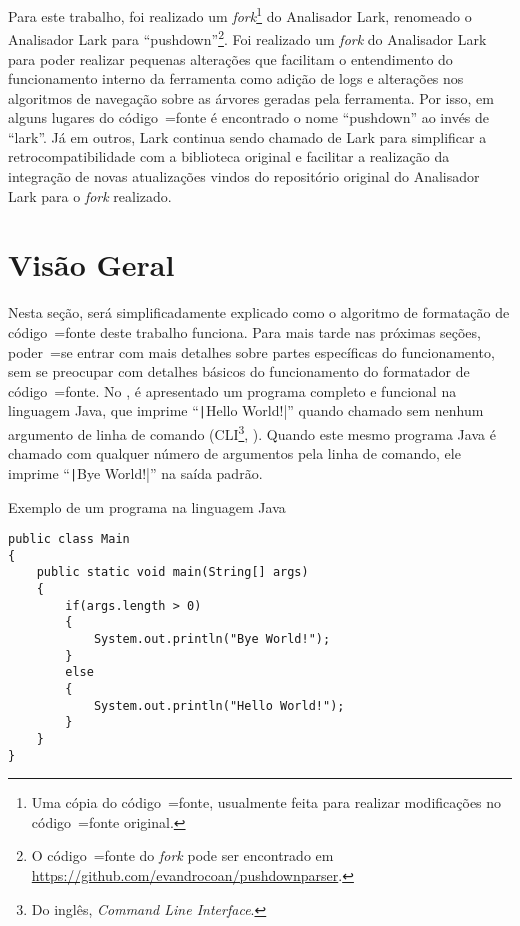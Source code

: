Para este trabalho,
foi realizado um \textit{fork}\footnote{
Uma cópia do código~=fonte,
usualmente feita para realizar modificações no código~=fonte original.
}
\cite{overviewOfGitHubForks,mayTheForkBeWithYou,collaborationAmongGitHubUsers} do Analisador Lark,
renomeado o Analisador Lark \cite{larkContextualLexer} para ``pushdown''\footnote{%
O código~=fonte do \textit{fork} pode ser encontrado em \url{https://github.com/evandrocoan/pushdownparser}.
}.
Foi realizado um \textit{fork} do Analisador Lark para poder realizar pequenas alterações que facilitam o entendimento do funcionamento interno da ferramenta como adição de logs e
alterações nos algoritmos de navegação sobre as árvores geradas pela ferramenta.
Por isso,
em alguns lugares do código~=fonte é encontrado o nome ``pushdown'' ao invés de ``lark''.
Já em outros,
Lark continua sendo chamado de Lark para simplificar a retrocompatibilidade com a biblioteca original e
facilitar a realização da integração de novas atualizações vindos do repositório original do Analisador Lark para o \textit{fork} realizado.


\section{Visão Geral}
\label{section:softwareImplementationVisaoGeral}

Nesta seção,
será simplificadamente explicado como o algoritmo de formatação de código~=fonte deste trabalho funciona.
Para mais tarde nas próximas seções,
poder~=se entrar com mais detalhes sobre partes específicas do funcionamento,
sem se preocupar com detalhes básicos do funcionamento do formatador de código~=fonte.
No ,
é apresentado um programa completo e
funcional na linguagem Java,
que imprime ``\texttt|Hello World!|'' quando chamado sem nenhum argumento de linha de comando (CLI\footnote{
Do inglês,
\textit{Command Line Interface}.
},
\cite{commandLineInterface}).
Quando este mesmo programa Java é chamado com qualquer número de argumentos pela linha de comando,
ele imprime ``\texttt|Bye World!|'' na saída padrão.
\begin{code}
\caption{Exemplo de um programa na linguagem Java}
\label{code:exemploDeUmProgramaNaLinguagemJava}
\begin{verbatim}
public class Main
{
    public static void main(String[] args)
    {
        if(args.length > 0)
        {
            System.out.println("Bye World!");
        }
        else
        {
            System.out.println("Hello World!");
        }
    }
}
\end{verbatim}
\end{code}

